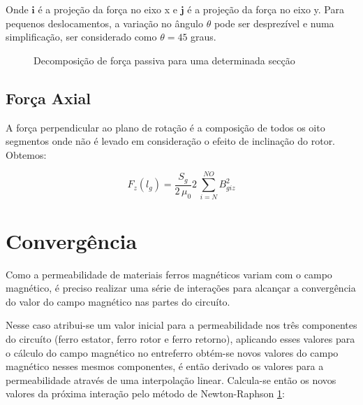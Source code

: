 Onde $\boldsymbol{i}$ é a projeção da força no eixo x e $\boldsymbol{j}$ é a projeção da força no eixo y. Para pequenos deslocamentos, a variação no ângulo $\theta$ pode ser desprezível e numa simplificação, ser considerado como $\theta = 45$ graus.

\begin{figure}[!ht]
	\centering
	
	\caption{Decomposição de força passiva para uma determinada secção}
	\label{fig:Passivo:decomposicao}
\end{figure}

\subsection{Força Axial}

A força perpendicular ao plano de rotação é a composição de todos os oito segmentos onde não é levado em consideração o efeito de inclinação do rotor. Obtemos:

\begin{equation}
F_z(l_g) = \frac{S_{g}}{2 \, \mu_0} 	2 \,\sum_{i=N}^{NO} B_{giz}^2
\end{equation}

\section{Convergência}

Como a permeabilidade de materiais ferros magnéticos variam com o campo magnético, é preciso realizar uma série de interações para alcançar a convergência do valor do campo magnético nas partes do circuíto. 

Nesse caso atribui-se um valor inicial para a permeabilidade nos três componentes do circuíto (ferro estator, ferro rotor e ferro retorno), aplicando esses valores para o cálculo do campo magnético no entreferro obtém-se novos valores do campo magnético nesses mesmos componentes, é então derivado os valores para a permeabilidade através de uma interpolação linear. Calcula-se então os novos valores da próxima interação pelo método de Newton-Raphson \ref{}: 



%

